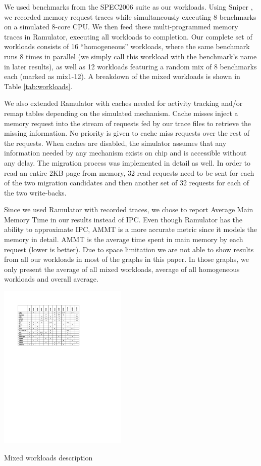 We used benchmarks from the SPEC2006 suite \cite{spec} as our workloads. Using Sniper \cite{sniper}, we recorded memory request traces while simultaneously executing 8 benchmarks on a simulated 8-core CPU. We then feed these multi-programmed memory traces in Ramulator, executing all workloads to completion. Our complete set of workloads consists of 16 ``homogeneous'' workloads, where the same benchmark runs 8 times in parallel (we simply call this workload with the benchmark's name in later results), as well as 12 workloads featuring a random mix of 8 benchmarks each (marked as mix1-12). A breakdown of the mixed workloads is shown in Table \ref{tab:workloads}.


We also extended Ramulator with caches needed for activity tracking and/or remap tables depending on the simulated mechanism. Cache misses inject a memory request into the stream of requests fed by our trace files to retrieve the missing information. No priority is given to cache miss requests over the rest of the requests. When caches are disabled, the simulator assumes that any information needed by any mechanism exists on chip and is accessible without any delay. The migration process was implemented in detail as well. In order to read an entire 2KB page from memory, 32 read requests need to be sent for each of the two migration candidates and then another set of 32 requests for each of the two write-backs.

Since we used Ramulator with recorded traces, we chose to report Average Main Memory Time in our results instead of IPC. Even though Ramulator has the ability to approximate IPC, AMMT is a more accurate metric since it models the memory in detail. AMMT is the average time spent in main memory by each request (lower is better). Due to space limitation we are not able to show results from all our workloads in most of the graphs in this paper. In those graphs, we only present the average of all mixed workloads, average of all homogeneous workloads and overall average.

\begin{table}
  \includegraphics[width=0.46\textwidth]{figures/workloads_checkmarks.pdf}
  \caption{Mixed workloads description}
  \label{tab:workloads}
\end{table}

